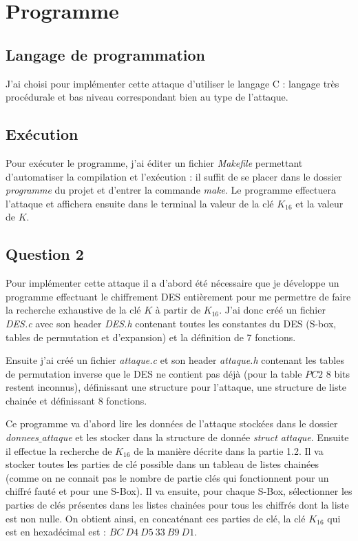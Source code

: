 \documentclass[10pt,a4paper]{article}
\begin{document}
\section{Programme}
\subsection{Langage de programmation}
J'ai choisi pour implémenter cette attaque d'utiliser le langage C : langage très procédurale et bas niveau correspondant bien au type de l'attaque.

\subsection{Exécution}
Pour exécuter le programme, j'ai éditer un fichier \textit{Makefile} permettant d'automatiser la compilation et l'exécution : il suffit de se placer dans le dossier \textit{programme} du projet et d'entrer la commande \textit{make}. Le programme effectuera l'attaque et affichera ensuite dans le terminal la valeur de la clé $K_{16}$ et la valeur de $K$. 

\subsection{Question 2}
Pour implémenter cette attaque il a d'abord été nécessaire que je développe un programme effectuant le chiffrement DES entièrement pour me permettre de faire la recherche exhaustive de la clé $K$ à partir de $K_{16}$. J'ai donc créé un fichier \textit{DES.c} avec son header \textit{DES.h} contenant toutes les constantes du DES (S-box, tables de permutation et d'expansion) et la définition de 7 fonctions.

Ensuite j'ai créé un fichier \textit{attaque.c} et son header \textit{attaque.h} contenant les tables de permutation inverse que le DES ne contient pas déjà (pour la table $PC2$ 8 bits restent inconnus), définissant une structure pour l'attaque, une structure de liste chainée et définissant 8 fonctions.

Ce programme va d'abord lire les données de l'attaque stockées dans le dossier \textit{donnees$\_$attaque} et les stocker dans la structure de donnée \textit{struct attaque}. Ensuite il effectue la recherche de $K_{16}$ de la manière décrite dans la partie 1.2. Il va stocker toutes les parties de clé possible dans un tableau de listes chainées (comme on ne connait pas le nombre de partie clés qui fonctionnent pour un chiffré fauté et pour une S-Box). Il va ensuite, pour chaque S-Box, sélectionner les parties de clés présentes dans les listes chainées pour tous les chiffrés dont la liste est non nulle. On obtient ainsi, en concaténant ces parties de clé, la clé $K_{16}$ qui est en hexadécimal est : $BC\ D4\ D5\ 33\ B9\ D1$.
\end{document}
